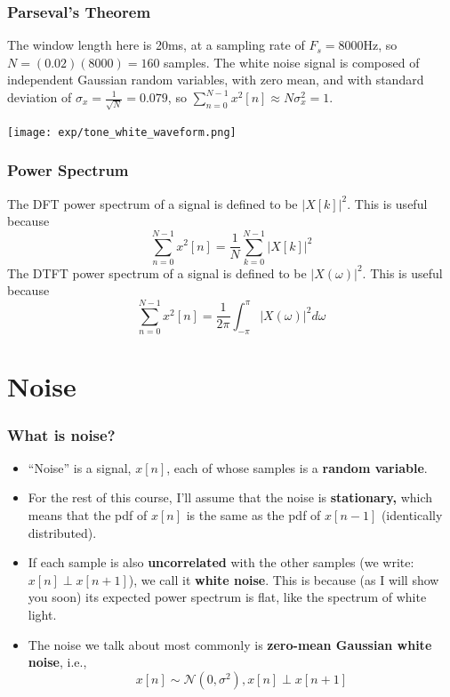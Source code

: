 \documentclass{beamer}
\begin{document}
\begin{frame}
  \frametitle{Parseval's Theorem}

  The window length here is 20ms, at a sampling rate of $F_s=8000$Hz,
  so $N=(0.02)(8000)=160$ samples.  The white noise signal is composed
  of independent Gaussian random variables, with zero mean, and with
  standard deviation of $\sigma_x=\frac{1}{\sqrt{N}}=0.079$, so
  $\sum_{n=0}^{N-1}x^2[n] \approx N\sigma_x^2 = 1$.
  
  \centerline{\texttt{[image: exp/tone\_white\_waveform.png]}}
\end{frame}

\begin{frame}
  \frametitle{Power Spectrum}

  The DFT power spectrum of a signal is defined to be $|X[k]|^2$.  This is
  useful because
  \[
  \sum_{n=0}^{N-1}x^2[n] = \frac{1}{N}\sum_{k=0}^{N-1}\left|X[k]\right|^2
  \]  
  The DTFT power spectrum of a signal is defined to be $|X(\omega)|^2$.  This
  is useful because
  \[
  \sum_{n=0}^{N-1}x^2[n] = \frac{1}{2\pi}\int_{-\pi}^{\pi}\left|X(\omega)\right|^2d\omega
  \]
\end{frame}

\section[Noise]{Noise}
\setcounter{subsection}{1}

\begin{frame}
  \frametitle{What is noise?}

  \begin{itemize}
    \item ``Noise'' is a signal, $x[n]$, each of whose samples is a
      {\bf random variable}.
    \item For the rest of this course, I'll assume that the noise is
      {\bf stationary,} which means that the pdf of $x[n]$ is the same
      as the pdf of $x[n-1]$ (identically distributed).
    \item If each sample is also {\bf uncorrelated} with the other
      samples (we write: $x[n]\perp x[n+1]$), we call it {\bf white
        noise}. This is because (as I will show you soon) its expected
      power spectrum is flat, like the spectrum of white light.
    \item The noise we talk about most commonly is {\bf zero-mean
      Gaussian white noise}, i.e.,
      \[
      x[n]\sim {\mathcal N}(0,\sigma^2), x[n]\perp x[n+1]
      \]
  \end{itemize}
\end{frame}
\end{document}
